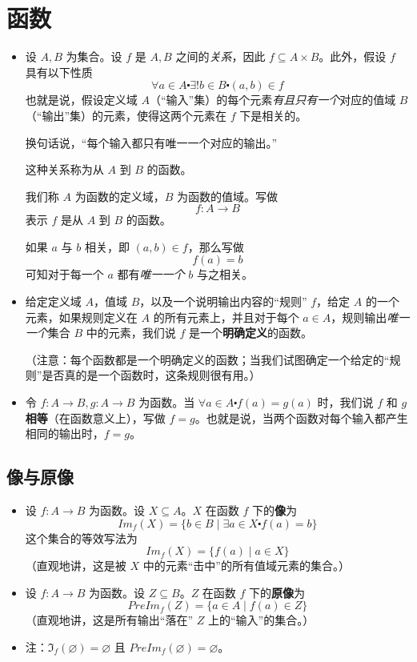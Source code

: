 \section{函数}

\begin{itemize}
    \item 设 $A,B$ 为集合。设 $f$ 是 $A, B$ 之间的\emph{关系}，因此 $f \subseteq A \times B$。此外，假设 $f$ 具有以下性质
          \[\forall a \in A \centerdot \exists! b \in B \centerdot (a, b) \in f\]
          也就是说，假设定义域 $A$（``输入''集）的每个元素\emph{有且只有一个}对应的值域 $B$（``输出''集）的元素，使得这两个元素在 $f$ 下是相关的。

          换句话说，``每个输入都只有唯一一个对应的输出。''

          这种关系称为从 $A$ 到 $B$ 的函数。

          我们称 $A$ 为函数的定义域，$B$ 为函数的值域。写做
          \[f:A \to B\]
          表示 $f$ 是从 $A$ 到 $B$ 的函数。

          如果 $a$ 与 $b$ 相关，即 $(a, b) \in f$，那么写做
          \[f(a) = b\]
          可知对于每一个 $a$ 都有\emph{唯一一个} $b$ 与之相关。
    \item 给定定义域 $A$，值域 $B$，以及一个说明输出内容的``规则'' $f$，给定 $A$ 的一个元素，如果规则定义在 $A$ 的所有元素上，并且对于每个 $a \in A$，规则输出\emph{唯一一个}集合 $B$ 中的元素，我们说 $f$ 是一个\textbf{明确定义}的函数。

          （注意：每个函数都是一个明确定义的函数；当我们试图确定一个给定的``规则''是否真的是一个函数时，这条规则很有用。）
    \item 令 $f : A \to B, g : A \to B$ 为函数。当 $\forall a \in A \centerdot f(a) = g(a)$ 时，我们说 $f$ 和 $g$ \textbf{相等}（在函数意义上），写做 $f = g$。也就是说，当两个函数对每个输入都产生相同的输出时，$f = g$。
\end{itemize}

\subsection{像与原像}

\begin{itemize}
    \item 设 $f : A \to B$ 为函数。设 $X \subseteq A$。$X$ 在函数 $f$ 下的\textbf{像}为
          \[Im_f (X) = \{b \in B \mid \exists a \in X \centerdot f(a) = b\}\]
          这个集合的等效写法为
          \[Im_f (X) = \{f(a) \mid a \in X\}\]
          （直观地讲，这是被 $X$ 中的元素``击中''的所有值域元素的集合。）
    \item 设 $f : A \to B$ 为函数。设 $Z \subseteq B$。$Z$ 在函数 $f$ 下的\textbf{原像}为
          \[PreIm_f (Z) = \{a \in A \mid f(a) \in Z\}\]
          （直观地讲，这是所有输出``落在'' $Z$ 上的``输入''的集合。）
    \item 注：$\Im_f (\varnothing) = \varnothing$ 且 $PreIm_f (\varnothing) = \varnothing$。
\end{itemize}

